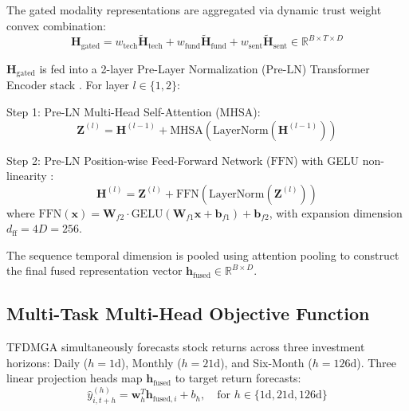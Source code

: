 The gated modality representations are aggregated via dynamic trust weight convex combination:
\begin{equation}
\mathbf{H}_{\text{gated}} = w_{\text{tech}} \tilde{\mathbf{H}}_{\text{tech}} + w_{\text{fund}} \tilde{\mathbf{H}}_{\text{fund}} + w_{\text{sent}} \tilde{\mathbf{H}}_{\text{sent}} \in \mathbb{R}^{B \times T \times D}
\label{eq:ch4_gated_sum}
\end{equation}

$\mathbf{H}_{\text{gated}}$ is fed into a 2-layer Pre-Layer Normalization ($\text{Pre-LN}$) Transformer Encoder stack \citep{vaswani2017attention, xiong2020layer}. For layer $l \in \{1, 2\}$:

Step 1: Pre-LN Multi-Head Self-Attention ($\text{MHSA}$):
\begin{equation}
\mathbf{Z}^{(l)} = \mathbf{H}^{(l-1)} + \text{MHSA}\left( \text{LayerNorm}(\mathbf{H}^{(l-1)}) \right)
\label{eq:ch4_pre_ln_mhsa}
\end{equation}

Step 2: Pre-LN Position-wise Feed-Forward Network ($\text{FFN}$) with GELU non-linearity \citep{hendrycks2016gaussian}:
\begin{equation}
\mathbf{H}^{(l)} = \mathbf{Z}^{(l)} + \text{FFN}\left( \text{LayerNorm}(\mathbf{Z}^{(l)}) \right)
\label{eq:ch4_pre_ln_ffn}
\end{equation}
where $\text{FFN}(\mathbf{x}) = \mathbf{W}_{f2} \cdot \text{GELU}(\mathbf{W}_{f1} \mathbf{x} + \mathbf{b}_{f1}) + \mathbf{b}_{f2}$, with expansion dimension $d_{\text{ff}} = 4D = 256$.

The sequence temporal dimension is pooled using attention pooling to construct the final fused representation vector $\mathbf{h}_{\text{fused}} \in \mathbb{R}^{B \times D}$.

\subsection{Multi-Task Multi-Head Objective Function}
\label{subsec:ch4_loss_function}

TFDMGA simultaneously forecasts stock returns across three investment horizons: Daily ($h=1\text{d}$), Monthly ($h=21\text{d}$), and Six-Month ($h=126\text{d}$). Three linear projection heads map $\mathbf{h}_{\text{fused}}$ to target return forecasts:
\begin{equation}
\hat{y}_{i,t+h}^{(h)} = \mathbf{w}_h^T \mathbf{h}_{\text{fused}, i} + b_h, \quad \text{for } h \in \{1\text{d}, 21\text{d}, 126\text{d}\}
\end{equation}

